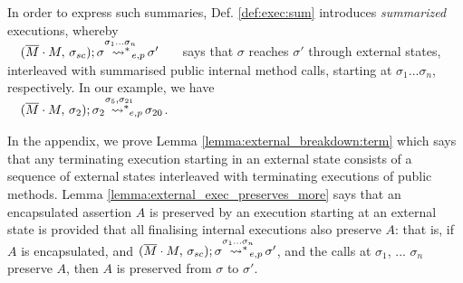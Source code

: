 \noindent 
In order to express such summaries, Def. \ref{def:exec:sum} introduces \emph{summarized} executions, whereby\\ 
$\strut \ \ \  \WithExtPub {\Mtwo\cdot M} {\sigma\bd}  {\sigma}  {\sigma'} {\sigma_1...\sigma_n}$  \ \  \ says that $\sigma$ reaches $\sigma'$ through 
external states, interleaved with summarised public internal method calls, starting at ${\sigma_1...\sigma_n}$, respectively.
In our example, we have\\
 $\strut \ \ \  \WithExtPub {\Mtwo\cdot M} {\sigma_2}  {\sigma_{2}}   {\sigma_{20}}  {\sigma_5,\sigma_{21}}$.


\vspace{.1cm}

In the appendix, we prove 
Lemma \ref{lemma:external_breakdown:term} which says that any terminating execution
 starting in an external state  consists of a  sequence of  external states interleaved with terminating executions
of public methods.
Lemma  \ref{lemma:external_exec_preserves_more} says that an encapsulated assertion $A$  is preserved by an execution
starting at an external state is provided that all finalising internal executions  %
also preserve $A$: that is, if $A$ is encapsulated, 
 and $\WithExtPub {\Mtwo\cdot M} {\sigma\bd}  {\sigma}  {\sigma'} {\sigma_1...\sigma_n}$, and 
 the calls at  $\sigma_1$, ... $\sigma_n$ preserve $A$,  then $A$ is preserved from $\sigma$ to $\sigma'$.  
% 
  


